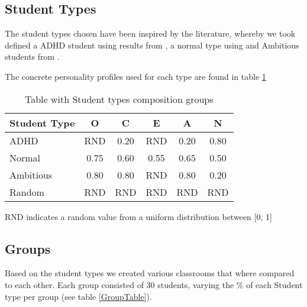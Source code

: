 \subsection{Student Types}
The student types chosen have been inspired by the literature, whereby we 
took defined a ADHD student using results from \cite{Nigg2002}, a normal type using
\cite{Srivastava2003} and Ambitious students from \cite{Asendorpf2003}.

The concrete personality profiles used for each type are found in table \ref{StudenTypesTable}

\begin{table}[h!]
    \centering
    \begin{tabular}{|l|c|c|c|c|c|} 
        \hline
        \textbf{Student Type} & \textbf{O} & \textbf{C} & \textbf{E} & \textbf{A} & \textbf{N} \\
        \hline
        \hline
        ADHD & RND & 0.20 & RND & 0.20 & 0.80 \\
        \hline
        Normal & 0.75 & 0.60 & 0.55 & 0.65 & 0.50 \\
        \hline
        Ambitious & 0.80 & 0.80 & RND & 0.80 & 0.20 \\
        \hline
        Random & RND & RND & RND & RND & RND \\
        \hline
    \end{tabular}
    \caption{Table with Student types composition groups}
    \small RND indicates a random value from a uniform distribution between [0, 1]
    \label{StudenTypesTable}
\end{table}

\subsection{Groups}
Based on the student types we created various classrooms that where compared to
each other. Each group consisted of 30 students, varying the \% of each Student
type per group (see table \ref{GroupTable}).

